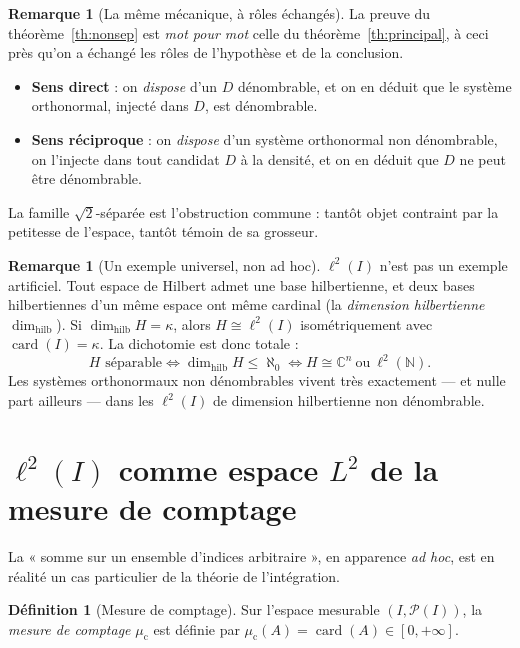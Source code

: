 \documentclass[11pt,a4paper]{article}
\theoremstyle{plain}
\theoremstyle{definition}
\newtheorem{definition}[theoreme]{Définition}
\newtheorem{remarque}[theoreme]{Remarque}
\newcommand{\C}{\mathbb{C}}
\newcommand{\N}{\mathbb{N}}
\newcommand{\HH}{H}
\newcommand{\card}{\operatorname{card}}
\newcommand{\muc}{\mu_{\mathrm{c}}}
\newcommand{\dimhilb}{\dim_{\mathrm{hilb}}}
\begin{document}
\begin{remarque}[La même mécanique, à rôles échangés]
La preuve du théorème~\ref{th:nonsep} est \emph{mot pour mot} celle du
théorème~\ref{th:principal}, à ceci près qu'on a échangé les rôles de
l'hypothèse et de la conclusion.
\begin{itemize}[nosep,leftmargin=1.4em]
  \item \textbf{Sens direct} : on \emph{dispose} d'un $D$ dénombrable, et on en
        déduit que le système orthonormal, injecté dans $D$, est dénombrable.
  \item \textbf{Sens réciproque} : on \emph{dispose} d'un système orthonormal non
        dénombrable, on l'injecte dans tout candidat $D$ à la densité, et on en
        déduit que $D$ ne peut être dénombrable.
\end{itemize}
La famille $\sqrt2$-séparée est l'obstruction commune : tantôt objet contraint
par la petitesse de l'espace, tantôt témoin de sa grosseur.
\end{remarque}

\begin{remarque}[Un exemple universel, non ad hoc]
$\ell^2(I)$ n'est pas un exemple artificiel. Tout espace de Hilbert admet une
base hilbertienne, et deux bases hilbertiennes d'un même espace ont même cardinal
(la \emph{dimension hilbertienne} $\dimhilb$). Si $\dimhilb \HH = \kappa$, alors
$\HH \cong \ell^2(I)$ isométriquement avec $\card(I) = \kappa$. La dichotomie est
donc totale :
\[
  \HH \text{ séparable}
  \iff \dimhilb \HH \le \aleph_0
  \iff \HH \cong \C^{n} \ \text{ou}\ \ell^2(\N).
\]
Les systèmes orthonormaux non dénombrables vivent très exactement — et nulle part
ailleurs — dans les $\ell^2(I)$ de dimension hilbertienne non dénombrable.
\end{remarque}

\section{\texorpdfstring{$\ell^2(I)$}{l2(I)} comme espace \texorpdfstring{$L^2$}{L2} de la mesure de comptage}

La « somme sur un ensemble d'indices arbitraire », en apparence \emph{ad hoc},
est en réalité un cas particulier de la théorie de l'intégration.

\begin{definition}[Mesure de comptage]
Sur l'espace mesurable $(I, \mathscr{P}(I))$, la \emph{mesure de comptage}
$\muc$ est définie par $\muc(A) = \card(A) \in [0,+\infty]$.
\end{definition}
\end{document}
